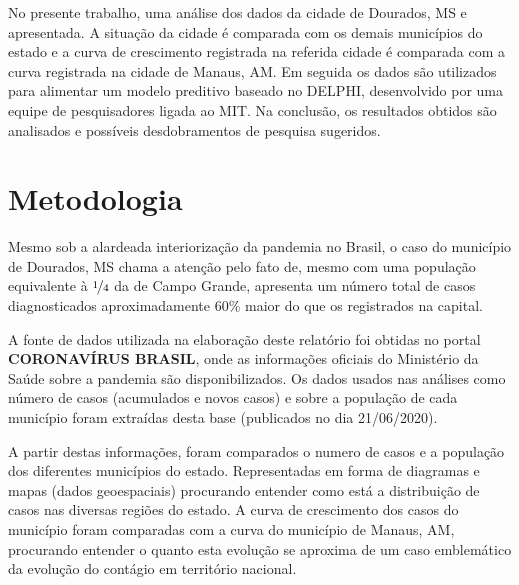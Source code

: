 \documentclass[12pt]{article}
\begin{document}
No presente trabalho, uma análise dos dados da cidade de Dourados, MS e apresentada. A situação da cidade é comparada com os demais municípios do estado e a curva de crescimento registrada na referida cidade é comparada com a curva registrada na cidade de Manaus, AM. Em seguida os dados são utilizados para alimentar um modelo preditivo baseado no DELPHI, desenvolvido por uma equipe de pesquisadores ligada ao MIT. Na conclusão, os resultados obtidos são analisados e possíveis desdobramentos de pesquisa sugeridos. 

\section{Metodologia}\label{sec:met}

Mesmo sob a alardeada interiorização da pandemia no Brasil, o caso do município de Dourados, MS chama a atenção pelo fato de, mesmo com uma população equivalente à \(\nicefrac{1}{4}\) da de Campo Grande, apresenta um número total de casos diagnosticados aproximadamente 60\% maior do que os registrados na capital.

A fonte de dados utilizada na elaboração deste relatório foi obtidas no portal \textbf{CORONAVÍRUS BRASIL}\cite{minsaude}, onde as informações oficiais do Ministério da Saúde sobre a pandemia são disponibilizados. Os dados usados nas análises como número de casos (acumulados e novos casos) e sobre a população de cada município foram extraídas desta base (publicados no dia 21/06/2020). 

A partir destas informações, foram comparados o numero de casos e a população dos diferentes municípios do estado. Representadas em forma de diagramas e mapas (dados geoespaciais) procurando entender como está a distribuição de casos nas diversas regiões do estado. A curva de crescimento dos casos do município foram comparadas com a curva do município de Manaus, AM, procurando entender o quanto esta evolução se aproxima de um caso emblemático da evolução do contágio em território nacional.
\end{document}
